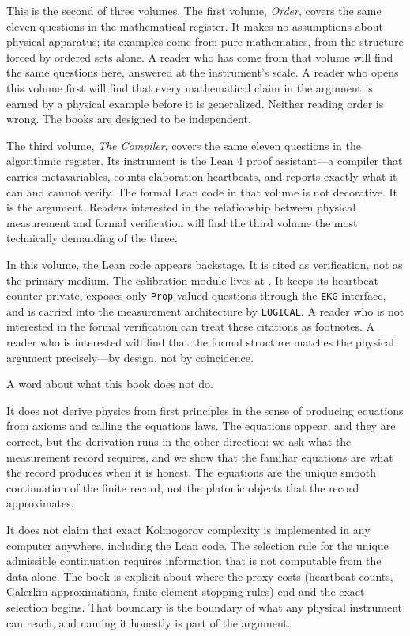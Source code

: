 \bigskip

This is the second of three volumes. The first volume, \textit{Order}, covers
the same eleven questions in the mathematical register. It makes no assumptions
about physical apparatus; its examples come from pure mathematics, from the
structure forced by ordered sets alone. A reader who has come from that volume
will find the same questions here, answered at the instrument's scale. A reader
who opens this volume first will find that every mathematical claim in the
argument is earned by a physical example before it is generalized. Neither
reading order is wrong. The books are designed to be independent.

The third volume, \textit{The Compiler}, covers the same eleven questions in
the algorithmic register. Its instrument is the Lean 4 proof assistant---a
compiler that carries metavariables, counts elaboration heartbeats, and reports
exactly what it can and cannot verify. The formal Lean code in that volume is
not decorative. It is the argument. Readers interested in the relationship
between physical measurement and formal verification will find the third volume
the most technically demanding of the three.

In this volume, the Lean code appears backstage. It is cited as verification,
not as the primary medium. The calibration module lives at
. It keeps its
heartbeat counter private, exposes only \texttt{Prop}-valued questions through
the \texttt{EKG} interface, and is carried into the measurement architecture by
\texttt{LOGICAL}. A reader who is not interested in the formal verification can
treat these citations as footnotes. A reader who is interested will find that the
formal structure matches the physical argument precisely---by design, not by
coincidence.

\bigskip

A word about what this book does not do.

It does not derive physics from first principles in the sense of producing
equations from axioms and calling the equations laws. The equations appear, and
they are correct, but the derivation runs in the other direction: we ask what
the measurement record requires, and we show that the familiar equations are
what the record produces when it is honest. The equations are the unique smooth
continuation of the finite record, not the platonic objects that the record
approximates.

It does not claim that exact Kolmogorov complexity is implemented in any
computer anywhere, including the Lean code. The selection rule for the unique
admissible continuation requires information that is not computable from the
data alone. The book is explicit about where the proxy costs (heartbeat counts,
Galerkin approximations, finite element stopping rules) end and the exact
selection begins. That boundary is the boundary of what any physical instrument
can reach, and naming it honestly is part of the argument.

